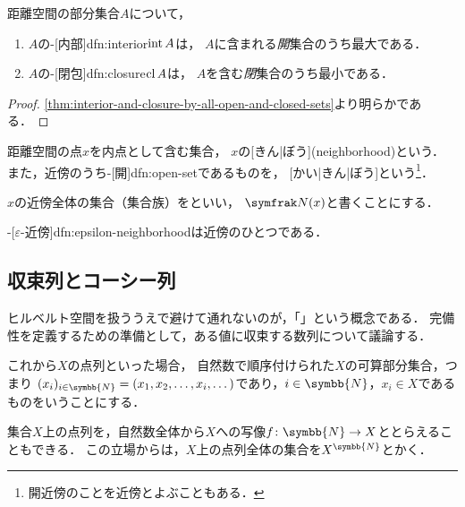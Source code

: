 \documentclass[../sotsu.tex]{subfiles}
\begin{document}
\begin{corollary}
    \label{thm:interior-or-closure-is-max-or-min}
    距離空間の部分集合$A$について，
    \begin{enumerate}
        \item $A$の-[内部]{dfn:interior}$\operatorname{int}{A}$は，
            $A$に含まれる\emph{開}集合のうち最大である．
        \item $A$の-[閉包]{dfn:closure}$\operatorname{cl}{A}$は，
            $A$を含む\emph{閉}集合のうち最小である．
    \end{enumerate}
\end{corollary}

\begin{proof}
    \cref{thm:interior-and-closure-by-all-open-and-closed-sets}より明らかである．
\end{proof}


\begin{definition}[近傍]
    \label{dfn:neighborhood}
    距離空間の点$x$を内点として含む集合，
    $x$の[きん|ぼう](neighborhood)という．
    また，近傍のうち-[開]{dfn:open-set}であるものを，
    [かい|きん|ぼう]という\footnote{
        開近傍のことを近傍とよぶこともある．
    }．

    $x$の近傍全体の集合（集合族）をといい，
    $\Neigh(x)$と書くことにする．
\end{definition}

-[$\varepsilon$-近傍]{dfn:epsilon-neighborhood}は近傍のひとつである．





\subsection{収束列とコーシー列}

ヒルベルト空間を扱ううえで避けて通れないのが，「」という概念である．
完備性を定義するための準備として，ある値に収束する数列について議論する．

これから$X$の点列といった場合，
自然数で順序付けられた$X$の可算部分集合，つまり
$\sequ{x_i}[i \in \symbb{N}] = (x_1, x_2, \dots, x_i, \dotsc)$であり，$i \in \symbb{N}$，$x_i \in X$であるものをいうことにする．

集合$X$上の点列を，自然数全体から$X$への写像$f \colon \symbb{N} \to X$ととらえることもできる．
この立場からは，$X$上の点列全体の集合を$X^{\symbb{N}}$とかく．
\end{document}

